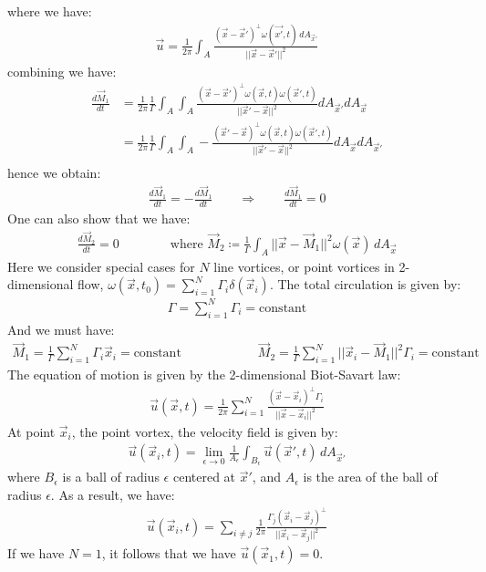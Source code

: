 \documentclass[11pt]{book}
\theoremstyle{break}
\theoremstyle{break}
\begin{document}
where we have:
\begin{align*}
\vec{u} = \frac{1}{2\pi}\int_A \frac{(\vec{x}-\vec{x}')^{\perp}\omega(\vec{x'},t) \, dA_{\vec{x}'}}{||\vec{x}-\vec{x}'||^2}
\end{align*}
combining we have:
\begin{align*}
\frac{d\vec{M}_1}{dt} &= \frac{1}{2\pi}\frac{1}{\Gamma} \int_A \int_A \frac{(\vec{x}-\vec{x}')^{\perp}\omega(\vec{x},t) \omega(\vec{x}',t)}{||\vec{x}'-\vec{x}||^2}dA_{\vec{x}'}dA_{\vec{x}}\\
&= \frac{1}{2\pi}\frac{1}{\Gamma} \int_A \int_A -\frac{(\vec{x}'-\vec{x})^{\perp}\omega(\vec{x},t) \omega(\vec{x}',t)}{||\vec{x}'-\vec{x}||^2}dA_{\vec{x}}dA_{\vec{x}'}\\
\end{align*}
hence we obtain:
\begin{align*}
\frac{d\vec{M}_1}{dt} = -\frac{d\vec{M}_1}{dt}\qquad \Rightarrow \qquad \frac{d\vec{M}_1}{dt} = 0
\end{align*}
One can also show that we have:
\begin{align*}
\frac{d\vec{M}_2}{dt} = 0 \qquad \qquad \text{where }\vec{M}_2 \coloneqq \frac{1}{\Gamma }\int_A ||\vec{x}-\vec{M}_1||^2 \omega(\vec{x}) \, dA_{\vec{x}}
\end{align*}
\hfill\break
Here we consider special cases for $N$ line vortices, or point vortices in 2-dimensional flow, $\omega(\vec{x},t_0) = \sum_{i=1}^N \Gamma_i \delta(\vec{x}_i)$. The total circulation is given by:
\begin{align*}
\Gamma = \sum_{i=1}^N \Gamma_i = \text{constant}
\end{align*}
And we must have:
\begin{align*}
\vec{M}_1 = \frac{1}{\Gamma} \sum_{i=1}^N \Gamma_i \vec{x}_i = \text{constant}\qquad\qquad\qquad
\vec{M}_2 = \frac{1}{\Gamma} \sum_{i=1}^N ||\vec{x}_i - \vec{M}_1||^2 \Gamma_i = \text{constant}
\end{align*}
The equation of motion is given by the 2-dimensional Biot-Savart law:
\begin{align*}
\vec{u}(\vec{x},t) = \frac{1}{2\pi}\sum_{i=1}^N \frac{(\vec{x}-\vec{x}_i)^{\perp}\Gamma_i}{||\vec{x} - \vec{x}_i||^2}
\end{align*}
At point $\vec{x}_i$, the point vortex, the velocity field is given by:
\begin{align*}
\vec{u}(\vec{x}_i, t) = \lim_{\epsilon \to 0}\frac{1}{A_{\epsilon}}\int_{B_\epsilon} \vec{u}(\vec{x}', t) \, dA_{\vec{x}'}
\end{align*} 
where $B_\epsilon$ is a ball of radius $\epsilon$ centered at $\vec{x}'$, and $A_{\epsilon}$ is the area of the ball of radius $\epsilon$. As a result, we have:
\begin{align*}
\vec{u}(\vec{x}_i, t) = \sum_{i\neq j} \frac{1}{2\pi}\frac{\Gamma_j (\vec{x}_i - \vec{x}_j)^{\perp}}{||\vec{x}_i - \vec{x}_j||^2}
\end{align*}
If we have $N = 1$, it follows that we have $\vec{u}(\vec{x}_1, t) = 0$.\\
\end{document}
